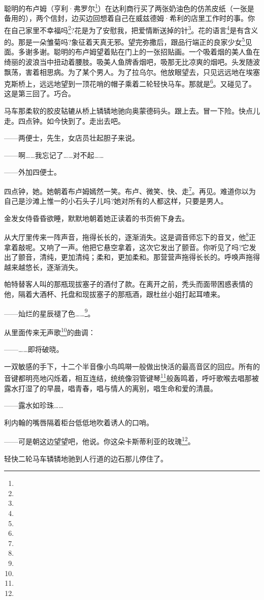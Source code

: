 \par 聪明的布卢姆（亨利·弗罗尔\footnote{}）在达利商行买了两张奶油色的仿羔皮纸（一张是备用的），两个信封，边买边回想着自己在威兹德姆·希利的店里工作时的事。你在自己家里不幸福吗\footnote{}?花是为了安慰我，把爱情断送掉的针\footnote{}。花的语言\footnote{}是有含义的。那是一朵雏菊吗?象征着天真无邪。望完弥撒后，跟品行端正的良家少女\footnote{}见面。多谢多谢。聪明的布卢姆望着贴在门上的一张招贴画。一个吸着烟的美人鱼在绮丽的波浪当中扭动着腰肢。吸美人鱼牌香烟吧，吸那无比凉爽的烟吧。头发随波飘荡，害着相思病。为了某个男人。为了拉乌尔。他放眼望去，只见远远地在埃塞克斯桥上，远远地望到一顶花哨的帽子乘着二轮轻快马车。那就是\footnote{}。又碰见了。这是第三回了。巧合。
\par 马车那柔软的胶皮轱辘从桥上辚辚地驰向奥蒙德码头。跟上去。冒一下险。快点儿走。四点钟。如今快到了。走出去吧。
\par ——两便士，先生，女店员壮起胆子来说。
\par ——啊……我忘记了……对不起……
\par ——外加四便士。
\par 四点钟，她。她朝着布卢姆嫣然一笑。布卢、微笑、快、走\footnote{}。再见。难道你以为自己是沙滩上惟一的小石头子儿吗?她对所有的人都这样，只要是男人。
\par 金发女侍昏昏欲睡，默默地朝着她正读着的书页俯下身去。
\par 从大厅里传来一阵声音，拖得长长的，逐渐消失。这是调音师忘下的音叉，他\footnote{}正拿着敲呢。又响了一声。他把它悬空拿着，这次它发出了颤音。你听见了吗?它发出了颤音，清纯，更加清纯；柔和，更加柔和。那营营声拖得长长的。呼唤声拖得越来越悠长，逐渐消失。
\par 帕特替客人叫的那瓶现拔塞子的酒付了款。在离开之前，秃头而面带困惑表情的他，隔着大酒杯、托盘和现拔塞子的那瓶酒，跟杜丝小姐打起耳喳来。
\par ——灿烂的星辰褪了色……\footnote{}。
\par 从里面传来无声歌\footnote{}的曲调：
\par ——……即将破晓。
\par 一双敏感的手下，十二个半音像小鸟鸣啭一般做出快活的最高音区的回应。所有的音键都明亮地闪烁着，相互连结，统统像羽管键琴\footnote{}般轰鸣着，呼吁歌喉去唱那被露水打湿了的早晨，唱青春，唱与情人的离别，唱生命和爱的清晨。
\par ——露水如珍珠……
\par 利内翰的嘴唇隔着柜台低低地吹着诱人的口哨。
\par ——可是朝这边望望吧，他说。你这朵卡斯蒂利亚的玫瑰\footnote{}。
\par 轻快二轮马车辚辚地驰到人行道的边石那儿停住了。
